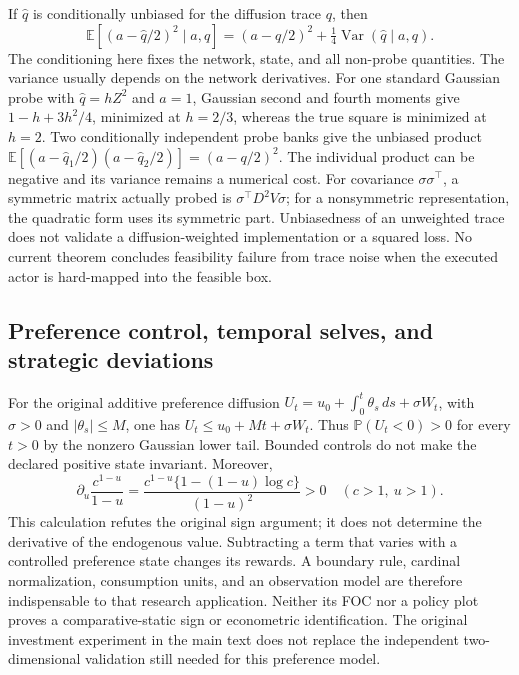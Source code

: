 If $\widehat q$ is conditionally unbiased for the diffusion trace $q$, then
\[
 \mathbb E[(a-\widehat q/2)^2\mid a,q]
       =(a-q/2)^2+\tfrac14\operatorname{Var}(\widehat q\mid a,q).
\]
The conditioning here fixes the network, state, and all non-probe
quantities.  The variance usually depends on the network derivatives.
For one standard Gaussian probe with $\widehat q=hZ^2$ and $a=1$, Gaussian
second and fourth moments give $1-h+3h^2/4$, minimized at $h=2/3$, whereas
the true square is minimized at $h=2$.  Two conditionally independent probe
banks give the unbiased product
$\mathbb E[(a-\widehat q_1/2)(a-\widehat q_2/2)]=(a-q/2)^2$.
The individual product can be negative and its variance remains a numerical
cost.  For covariance $\sigma\sigma^\top$, a symmetric matrix actually
probed is $\sigma^\top D^2V\sigma$; for a nonsymmetric representation, the
quadratic form uses its symmetric part.  Unbiasedness of an unweighted trace
does not validate a diffusion-weighted implementation or a squared loss.
No current theorem concludes feasibility failure from trace noise when the
executed actor is hard-mapped into the feasible box.

\subsection{Preference control, temporal selves, and strategic deviations}
\label{dev:extensions119}

For the original additive preference diffusion
$U_t=u_0+\int_0^t\theta_s\,ds+\sigma W_t$, with $\sigma>0$ and
$|\theta_s|\le M$, one has $U_t\le u_0+Mt+\sigma W_t$.
Thus $\mathbb P(U_t<0)>0$ for every $t>0$ by the nonzero Gaussian lower
tail.  Bounded controls do not make the declared positive state invariant.
Moreover,
\[
 \partial_u\frac{c^{1-u}}{1-u}
   =\frac{c^{1-u}\{1-(1-u)\log c\}}{(1-u)^2}>0
       \quad(c>1,\ u>1).
\]
This calculation refutes the original sign argument; it does not determine
the derivative of the endogenous value.  Subtracting a term that varies
with a controlled preference state changes its rewards.  A boundary rule,
cardinal normalization, consumption units, and an observation model are
therefore indispensable to that research application.  Neither its FOC nor
a policy plot proves a comparative-static sign or econometric identification.
The original investment experiment in the main text does not replace the
independent two-dimensional validation still needed for this preference
model.

